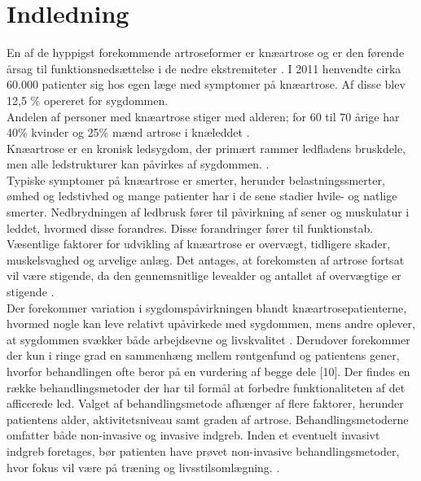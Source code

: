 \section{Indledning}
En af de hyppigst forekommende artroseformer er knæartrose og er den førende årsag til funktionsnedsættelse i de nedre ekstremiteter \cite{bezwick2012}. I 2011 henvendte cirka 60.000 patienter sig hos egen læge med symptomer på knæartrose. Af disse blev 12,5 \% opereret for sygdommen. \citep{brostrom2012} \\
Andelen af personer med knæartrose stiger med alderen; for 60 til 70 årige har 40\% kvinder og 25\% mænd artrose i knæleddet \citep{schroder}.\\
Knæartrose er en kronisk ledsygdom, der primært rammer ledfladens bruskdele, men alle ledstrukturer kan påvirkes af sygdommen. \citep{schroder}. \\
Typiske symptomer på knæartrose er smerter, herunder belastningssmerter,  ømhed og ledstivhed og mange patienter har i de sene stadier hvile- og natlige smerter. Nedbrydningen af ledbrusk fører til påvirkning af sener og muskulatur i leddet, hvormed disse forandres. Disse forandringer fører til funktionstab.\\ 
Væsentlige faktorer for udvikling af knæartrose er overvægt, tidligere skader, muskelsvaghed og arvelige anlæg. Det antages, at forekomsten af artrose fortsat vil være stigende, da den gennemsnitlige levealder og antallet af overvægtige er stigende \citep{sygdom}.\\
Der forekommer variation i sygdomspåvirkningen blandt knæartrosepatienterne, hvormed nogle kan leve relativt upåvirkede med sygdommen, mens andre oplever, at sygdommen svækker både arbejdsevne og livskvalitet \citep{sygdom}. Derudover forekommer der kun i ringe grad en sammenhæng mellem røntgenfund og patientens gener, hvorfor behandlingen ofte beror på en vurdering af begge dele [10]. Der findes en række behandlingsmetoder der har til formål at forbedre funktionaliteten af det afficerede led. Valget af behandlingsmetode afhænger af flere faktorer, herunder patientens alder, aktivitetsniveau samt graden af artrose. Behandlingsmetoderne omfatter både non-invasive og invasive indgreb. Inden et eventuelt invasivt indgreb foretages, bør patienten have prøvet non-invasive behandlingsmetoder, hvor fokus vil være på træning og livsstilsomlægning. \citep{schroder}.
